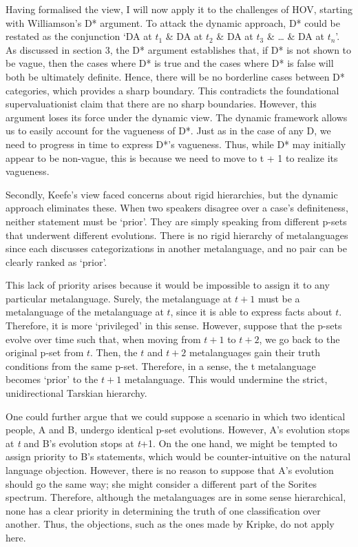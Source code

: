 Having formalised the view, I will now apply it to the challenges of
HOV, starting with Williamson's D* argument. To attack the dynamic
approach, D* could be restated as the conjunction `DA at \(t_{1}\) \& DA
at \(t_{2}\) \& DA at \(t_{3}\) \& \ldots{} \& DA at \(t_{n}\)'. As
discussed in section 3, the D* argument establishes that, if D* is not
shown to be vague, then the cases where D* is true and the cases where
D* is false will both be ultimately definite. Hence, there will be no
borderline cases between D* categories, which provides a sharp boundary.
This contradicts the foundational supervaluationist claim that there are
no sharp boundaries. However, this argument loses its force under the
dynamic view. The dynamic framework allows us to easily account for the
vagueness of D*. Just as in the case of any D, we need to progress in
time to express D*'s vagueness. Thus, while D* may initially appear to
be non-vague, this is because we need to move to t + 1 to realize its
vagueness.

Secondly, Keefe's view faced concerns about rigid hierarchies, but the
dynamic approach eliminates these. When two speakers disagree over a
case's definiteness, neither statement must be `prior'. They are simply
speaking from different p-sets that underwent different evolutions.
There is no rigid hierarchy of metalanguages since each discusses
categorizations in another metalanguage, and no pair can be clearly
ranked as `prior'.

This lack of priority arises because it would be impossible to assign it
to any particular metalanguage. Surely, the metalanguage at $t+1$
must be a metalanguage of the metalanguage at $t$, since it is able
to express facts about $t$. Therefore, it is more `privileged' in
this sense. However, suppose that the p-sets evolve over time such that,
when moving from $t+1$ to $t+2$, we go back to the original
p-set from $t$. Then, the $t$ and $t+2$ metalanguages
gain their truth conditions from the same p-set. Therefore, in a sense,
the t metalanguage becomes `prior' to the $t+1$ metalanguage. This
would undermine the strict, unidirectional Tarskian hierarchy.

One could further argue that we could suppose a scenario in which two
identical people, A and B, undergo identical p-set evolutions. However,
A's evolution stops at \emph{t} and B's evolution stops at \emph{t}+1.
On the one hand, we might be tempted to assign priority to B's
statements, which would be counter-intuitive on the natural language
objection. However, there is no reason to suppose that A's evolution
should go the same way; she might consider a different part of the
Sorites spectrum. Therefore, although the metalanguages are in some
sense hierarchical, none has a clear priority in determining the truth
of one classification over another. Thus, the objections, such as the
ones made by Kripke, do not apply here.


